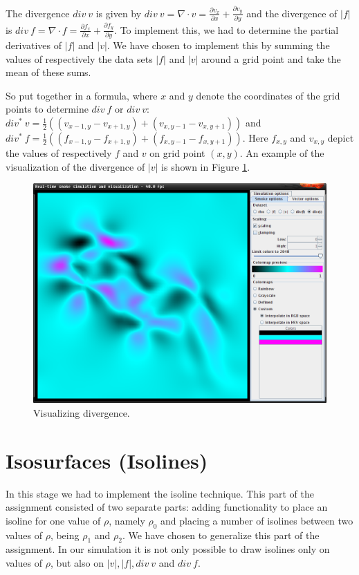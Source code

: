 \documentclass[a4paper,11pt,twoside]{report}
\begin{document}
        The divergence $div~v$ is given by $div~v = \nabla \cdot v = \frac{\partial v_x}{\partial x} + \frac{\partial v_y}{\partial y}$ and the divergence of $|f|$ is $div~f = \nabla \cdot f = \frac{\partial f_x}{\partial x} + \frac{\partial f_y}{\partial y}$. To implement this, we had to determine the partial derivatives of $|f|$ and $|v|$. We have chosen to implement this by summing the values of respectively the data sets $|f|$ and $|v|$ around a grid point and take the mean of these sums.

        So put together in a formula, where $x$ and $y$ denote the coordinates of the grid points to determine $div~f$ or $div~v$: $div^*~v = \frac{1}{2}((v_{x-1,y} - v_{x+1,y}) + (v_{x,y-1} - v_{x,y+1}))$ and $div^*~f = \frac{1}{2}((f_{x-1,y} - f_{x+1,y}) + (f_{x,y-1} - f_{x,y+1}))$. Here $f_{x,y}$ and $v_{x,y}$ depict the values of respectively $f$ and $v$ on grid point $(x,y)$.   An example of the visualization of the divergence of $|v|$ is shown in Figure \ref{fig:step4}.
		\begin{figure}[h]
		\centering
		\includegraphics[scale=\imagescalefactor]{images/step4.png}
		\caption{Visualizing divergence.}\label{fig:step4}
		\end{figure}
		\clearpage
	\section{Isosurfaces (Isolines)}
        In this stage we had to implement the isoline technique. This part of the assignment consisted of two separate parts: adding functionality to place an isoline for one value of $\rho$, namely $\rho_0$ and placing a number of isolines between two values of $\rho$, being $\rho_1$ and $\rho_2$. We have chosen to generalize this part of the assignment. In our simulation it is not only possible to draw isolines only on values of $\rho$, but also on $|v|, |f|, div~v$ and $div~f$.
        
\end{document}
